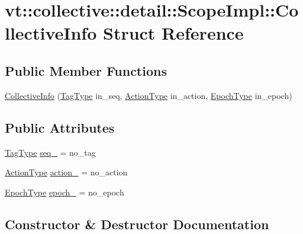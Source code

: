 \hypertarget{structvt_1_1collective_1_1detail_1_1_scope_impl_1_1_collective_info}{}\section{vt\+:\+:collective\+:\+:detail\+:\+:Scope\+Impl\+:\+:Collective\+Info Struct Reference}
\label{structvt_1_1collective_1_1detail_1_1_scope_impl_1_1_collective_info}
\subsection*{Public Member Functions}
\begin{DoxyCompactItemize}
\item 
\hyperlink{structvt_1_1collective_1_1detail_1_1_scope_impl_1_1_collective_info_a6c03d32c5e4fd0239bdb4e62e5971e37}{Collective\+Info} (\hyperlink{namespacevt_a84ab281dae04a52a4b243d6bf62d0e52}{Tag\+Type} in\+\_\+seq, \hyperlink{namespacevt_ae0a5a7b18cc99d7b732cb4d44f46b0f3}{Action\+Type} in\+\_\+action, \hyperlink{namespacevt_a985a5adf291c34a3ca263b3378388236}{Epoch\+Type} in\+\_\+epoch)
\end{DoxyCompactItemize}
\subsection*{Public Attributes}
\begin{DoxyCompactItemize}
\item 
\hyperlink{namespacevt_a84ab281dae04a52a4b243d6bf62d0e52}{Tag\+Type} \hyperlink{structvt_1_1collective_1_1detail_1_1_scope_impl_1_1_collective_info_ae8212822c750374cb79a37fe0ef21d7e}{seq\+\_\+} = no\+\_\+tag
\item 
\hyperlink{namespacevt_ae0a5a7b18cc99d7b732cb4d44f46b0f3}{Action\+Type} \hyperlink{structvt_1_1collective_1_1detail_1_1_scope_impl_1_1_collective_info_a60c9ddcd8da8dbab5b66fcef3b6f8ce9}{action\+\_\+} = no\+\_\+action
\item 
\hyperlink{namespacevt_a985a5adf291c34a3ca263b3378388236}{Epoch\+Type} \hyperlink{structvt_1_1collective_1_1detail_1_1_scope_impl_1_1_collective_info_a36a452ee7268f79249b791b76d81e3ec}{epoch\+\_\+} = no\+\_\+epoch
\end{DoxyCompactItemize}


\subsection{Constructor \& Destructor Documentation}
\mbox{\label{structvt_1_1collective_1_1detail_1_1_scope_impl_1_1_collective_info_a6c03d32c5e4fd0239bdb4e62e5971e37}} 
